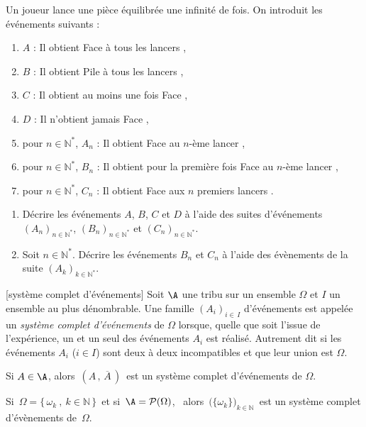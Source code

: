 \documentclass[a4paper,10pt]{report}
\begin{document}
\begin{itemize}
\medskip

\begin{Exemple} Un joueur lance  une pièce équilibrée une infinité de fois. On introduit les événements suivants :
\begin{enumerate}
\item[\tri] $A$ : \og Il obtient Face à tous les lancers \fg,
\item[\tri] $B$ : \og Il obtient Pile à tous les lancers \fg,
\item[\tri] $C$ : \og Il obtient au moins une fois Face \fg,
\item[\tri] $D$ : \og Il n'obtient jamais Face \fg,
\item[\tri] pour $n \in \mathbb{N}^*$, $A_n$ : \og Il obtient Face au $n$-ème lancer \fg,
\item[\tri] pour $n \in \mathbb{N}^*$, $B_n$ : \og Il obtient pour la première fois Face au $n$-ème lancer \fg,
\item[\tri] pour $n \in \mathbb{N}^*$, $C_n$ : \og Il obtient Face aux $n$ premiers lancers \fg.
\end{enumerate}
\begin{enumerate}
\item Décrire les événements $A$, $B$, $C$ et $D$ à l'aide des suites d'événements $(A_n)_{n \in \mathbb{N}^*}$, $(B_n)_{n \in \mathbb{N}^*}$ et $(C_n)_{n \in \mathbb{N}^*}$.

\vspace{3cm}
\item Soit $n \in \mathbb{N}^*$. Décrire les événements $B_n$ et $C_n$ à l'aide des évènements de la suite $(A_k)_{k \in \mathbb{N}^*}$.

\vspace{3cm}
\end{enumerate}
\end{Exemple}



\begin{Definition}{}[système complet d'événements]
Soit $\A$ une tribu sur un ensemble $\Omega$ et $I$ un ensemble au plus dénombrable.
Une famille $(A_i)_{i\in\, I}$ {d'événements} est appelée un \emph{système complet d'événements} de $\Omega$ lorsque, quelle que soit l'issue de l'expérience, un et un seul des événements $A_i$ est réalisé. Autrement dit si les événements $A_i$ ($i \in I$) sont deux à deux incompatibles et que leur union est $\Omega$.
\end{Definition}

\begin{exems}
\item Si $A\in \A$, alors $\,(A\,,\,\overline A\,)\,$ est un système complet d'événements de $\Omega$.
\item Si $\,\Omega = \{\,\omega _k\ , \ k\in  \mathbb N\,\}\,$ et si $\,\A = \mathcal P(\Omega )$, \ 
alors $\,\big(\{\omega _k\}\big) _{k\in \mathbb N}\,$ est un système complet d'évènements de $\,\Omega$.
\end{exems}


\end{itemize}
\end{document}
